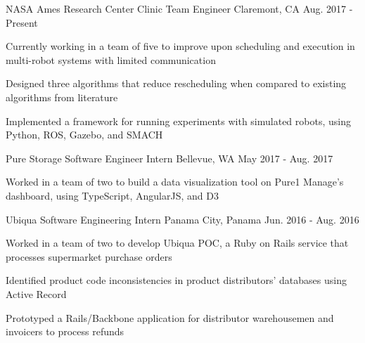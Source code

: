 

\begin{cventries}

  \cventry
    {NASA Ames Research Center} %
    {Clinic Team Engineer} %
    {Claremont, CA} %
    {Aug. 2017 - Present} %
    {
      \begin{cvitems} %
        \item {Currently working in a team of five to improve upon scheduling
        and execution in multi-robot systems with limited communication}
        \item {Designed three algorithms that reduce rescheduling when compared
        to existing algorithms from literature}
        \item {Implemented a framework for running experiments with simulated
        robots, using Python, ROS, Gazebo, and SMACH}
      \end{cvitems}
    }

  \cventry
    {Pure Storage} %
    {Software Engineer Intern} %
    {Bellevue, WA} %
    {May 2017 - Aug. 2017} %
    {
      \begin{cvitems} %
        \item {Worked in a team of two to build a data visualization tool on
        Pure1 Manage's dashboard, using TypeScript, AngularJS, and D3}
      \end{cvitems}
    }

  \cventry
    {Ubiqua} %
    {Software Engineering Intern} %
    {Panama City, Panama} %
    {Jun. 2016 - Aug. 2016} %
    {
      \begin{cvitems} %
        \item {Worked in a team of two to develop Ubiqua POC, a Ruby on Rails
        service that processes supermarket purchase orders}
        \item {Identified product code inconsistencies in product distributors’
        databases using Active Record}
        \item {Prototyped a Rails/Backbone application for distributor
        warehousemen and invoicers to process refunds}
      \end{cvitems}
    }


\end{cventries}
